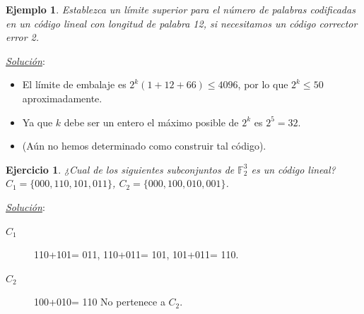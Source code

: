 \documentclass{beamer}
\theoremstyle{plain}
\theoremstyle{example}
\newtheorem{ejercicio} [Ejercicio]{Ejercicio}
\theoremstyle{example}
\newtheorem{ejemplo} [Ejemplo] {Ejemplo}
\begin{document}
\begin{frame}  \small  

\begin{ejemplo}

Establezca un límite superior para el número de palabras codificadas en un código lineal con longitud  de palabra 12, si necesitamos un código corrector error 2.\\
\end{ejemplo}

\textit{\underline{Solución}}:\\

\begin{itemize}
\item El límite de embalaje es $2^k(1 + 12 + 66) \leq 4096$, por lo que $2^k \leq 50$ aproximadamente. 

\item Ya que $k$ debe ser un entero el máximo posible de $2^k$ es $2^5=32$. 

\item (Aún no hemos determinado como construir tal código).

\end{itemize}

\end{frame} 




\begin{frame}  \small \begin{ejercicio} 
¿Cual de los siguientes subconjuntos de $\mathbb{F}^3_2$ es un código lineal? $C_1 = \{000, 110, 101, 011\}$, $C_2 = \{000, 100, 010, 001\}$.

\end{ejercicio} %
\textit{\underline{Solución}}:\\ 
\vspace{0.3cm}
\begin{description}
\item[$C_1$] 110+101= 011, 110+011= 101, 101+011= 110.
\item[$C_2$] 100+010= 110 No pertenece a $C_2$.
\end{description}

\end{frame} 
\end{document}
